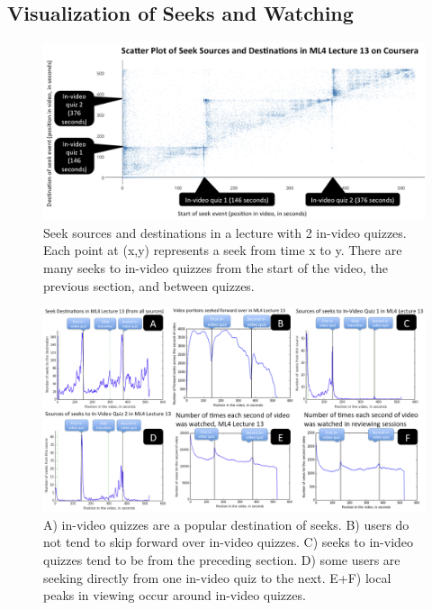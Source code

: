 \documentclass{sigchi}
\begin{document}
\subsection{Visualization of Seeks and Watching}

\begin{figure}
\includegraphics[width=2.0\columnwidth]{scatter-plot-of-seeks}
\caption{Seek sources and destinations in a lecture with 2 in-video quizzes. Each point at (x,y) represents a seek from time x to y. There are many seeks to in-video quizzes from the start of the video, the previous section, and between quizzes.}
\label{fig:scatter-plot-of-seeks}
\end{figure}

\begin{figure}
\includegraphics[width=2.0\columnwidth]{lec13-multiplot}
\caption{A) in-video quizzes are a popular destination of seeks. B) users do not tend to skip forward over in-video quizzes. C) seeks to in-video quizzes tend to be from the preceding section. D) some users are seeking directly from one in-video quiz to the next. E+F) local peaks in viewing occur around in-video quizzes.}
\label{fig:lec13-multiplot}
\end{figure}
\end{document}
